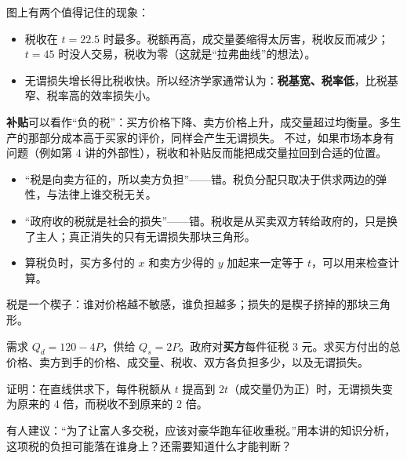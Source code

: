 图上有两个值得记住的现象：
\begin{itemize}
  \item 税收在 $t=22.5$ 时最多。税额再高，成交量萎缩得太厉害，税收反而减少；$t=45$ 时没人交易，税收为零（这就是“拉弗曲线”的想法）。
  \item 无谓损失增长得比税收快。所以经济学家通常认为：\textbf{税基宽、税率低}，比税基窄、税率高的效率损失小。
\end{itemize}

\begin{remark}
\textbf{补贴}可以看作“负的税”：买方价格下降、卖方价格上升，成交量超过均衡量。多生产的那部分成本高于买家的评价，同样会产生无谓损失。
不过，如果市场本身有问题（例如第 4 讲的外部性），税收和补贴反而能把成交量拉回到合适的位置。
\end{remark}

\begin{pitfall}
\begin{itemize}
  \item “税是向卖方征的，所以卖方负担”——错。税负分配只取决于供求两边的弹性，与法律上谁交税无关。
  \item “政府收的税就是社会的损失”——错。税收是从买卖双方转给政府的，只是换了主人；真正消失的只有无谓损失那块三角形。
  \item 算税负时，买方多付的 $x$ 和卖方少得的 $y$ 加起来一定等于 $t$，可以用来检查计算。
\end{itemize}
\end{pitfall}

\begin{oneline}
税是一个楔子：谁对价格越不敏感，谁负担越多；损失的是楔子挤掉的那块三角形。
\end{oneline}

\begin{exercises}[练一练]
  \item 需求 $Q_d=120-4P$，供给 $Q_s=2P$。政府对\textbf{买方}每件征税 3 元。求买方付出的总价格、卖方到手的价格、成交量、税收、双方各负担多少，以及无谓损失。
  \item 证明：在直线供求下，每件税额从 $t$ 提高到 $2t$（成交量仍为正）时，无谓损失变为原来的 4 倍，而税收不到原来的 2 倍。
  \item 有人建议：“为了让富人多交税，应该对豪华跑车征收重税。”用本讲的知识分析，这项税的负担可能落在谁身上？还需要知道什么才能判断？
\end{exercises}

